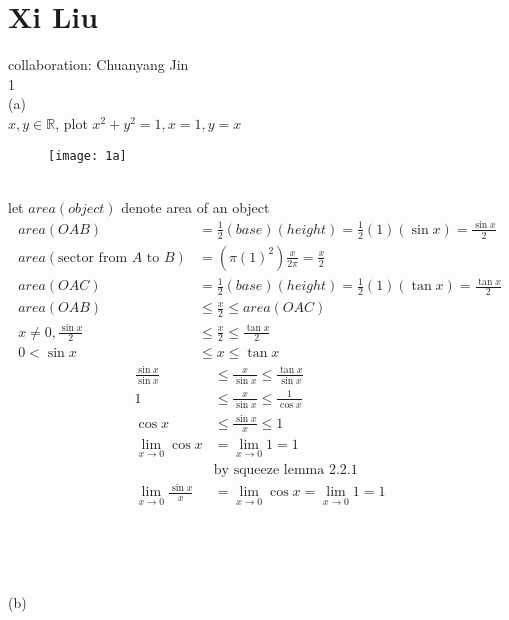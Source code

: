\documentclass[12pt, border = 4pt, multi]{article} %
\begin{document}
\section*{Xi Liu}
collaboration: Chuanyang Jin\\
1\\
(a)\\
$x, y \in \mathbb{R}$, plot $x ^ 2 + y ^ 2 = 1, x = 1, y = x$\\
\begin{figure}[h!]
	\centering
	\texttt{[image: 1a]}
\end{figure}\\
let $area(object)$ denote area of an object\\
\begin{align*}
area(OAB) &= \frac{1}{2}(base)(height) = \frac{1}{2}(1)(\sin x) = \frac{\sin x}{2}\\
area(\text{sector from } A \text{ to } B) &= (\pi(1) ^ 2)\frac{x}{2\pi} = \frac{x}{2}\\
area(OAC) &= \frac{1}{2}(base)(height) = \frac{1}{2}(1)(\tan x) = \frac{\tan x}{2}\\
area(OAB) &\leq \frac{x}{2} \leq area(OAC)\\
x \not= 0, \frac{\sin x}{2} &\leq \frac{x}{2} \leq \frac{\tan x}{2}\\
0 < \sin x &\leq x \leq \tan x
\end{align*}
\begin{align*}
\frac{\sin x}{\sin x} &\leq \frac{x}{\sin x} \leq \frac{\tan x}{\sin x}\\
1 &\leq \frac{x}{\sin x} \leq \frac{1}{\cos x}\\
\cos x &\leq \frac{\sin x}{x} \leq 1\\
\lim_{x \rightarrow 0} \cos x &= \lim_{x \rightarrow 0} 1 = 1\\
&\text{by squeeze lemma 2.2.1}\\
\lim_{x \rightarrow 0} \frac{\sin x}{x} &= \lim_{x \rightarrow 0} \cos x = \lim_{x \rightarrow 0} 1 = 1\\
\end{align*}
\\
\\
\\
\\
(b)
\end{document}
